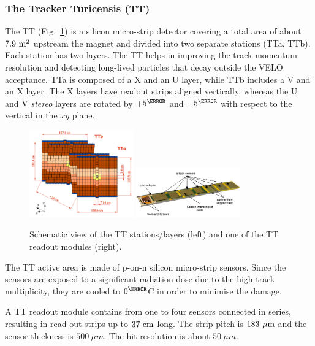 \subsubsection*{The Tracker Turicensis (TT)}

The TT \cite{LHCb-TDR-009} (Fig.~\ref{fig:TT}) is a silicon micro-strip detector covering a total area of about $7.9~\rm m^2$ upstream the magnet and divided into two separate stations (TTa, TTb). Each station has two layers. The TT helps in improving the track momentum resolution and detecting long-lived particles that decay outside the VELO acceptance. TTa is composed of a X and an U layer, while TTb includes a V and an X layer. The X layers have readout strips aligned vertically, whereas the U and V \emph{stereo} layers are rotated by $+5^{\degree}$ and $-5^{\degree}$ with respect to the vertical in the $xy$ plane.

\begin{figure}[t]
  \begin{center}
    \includegraphics[width=0.4\textwidth]{02LHCb/figs/TT-scheme.png}
    \includegraphics[width=0.4\textwidth]{02LHCb/figs/TT-strip-layout.png}
  \end{center}
  \vspace{-2mm}
  \caption{Schematic view of the TT stations/layers (left) and one of the TT readout modules (right).}
  \label{fig:TT}
\end{figure}


The TT active area is made of p-on-n silicon micro-strip sensors. Since the sensors are exposed to a significant radiation dose due to the high track multiplicity, they are cooled to $0^{\degree}$C in order to minimise the damage.

A TT readout module contains from one to four sensors connected in series, resulting in read-out strips up to $37~\rm cm$ long. The strip pitch is $183~\rm\mu m$ and the sensor thickness is $500~\mu m$. The hit resolution is about $50~\mu m$.

